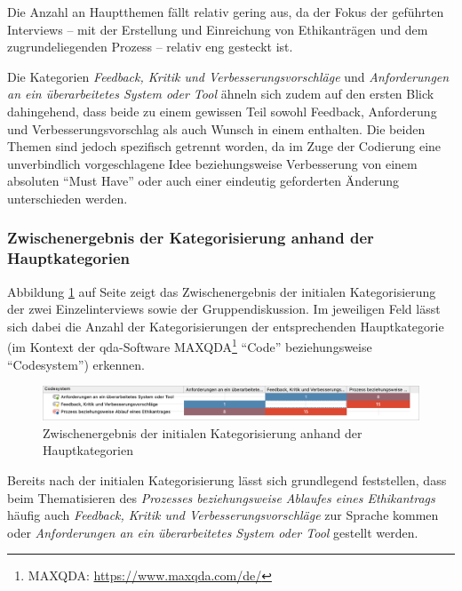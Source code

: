 \documentclass[a4paper,12pt,twoside,numbers=noendperiod]{scrreprt}
\begin{document}
Die Anzahl an Hauptthemen fällt relativ gering aus, da der Fokus der geführten Interviews -- mit der Erstellung und Einreichung von Ethikanträgen und dem zugrundeliegenden Prozess -- relativ eng gesteckt ist.

Die Kategorien \textit{Feedback, Kritik und Verbesserungsvorschläge} und \textit{Anforderungen an ein überarbeitetes System oder Tool} ähneln sich zudem auf den ersten Blick dahingehend, dass beide zu einem gewissen Teil sowohl Feedback, Anforderung und Verbesserungsvorschlag als auch Wunsch in einem enthalten. Die beiden Themen sind jedoch spezifisch getrennt worden, da im Zuge der Codierung eine unverbindlich vorgeschlagene Idee beziehungsweise Verbesserung von einem absoluten \enquote{Must Have} oder auch einer eindeutig geforderten Änderung unterschieden werden.

\subsubsection*{Zwischenergebnis der Kategorisierung anhand der Hauptkategorien}
\label{sub-sub-sec:zwischenstand-hauptkategorisisierung}

Abbildung \ref{fig:zwischenstand-hauptkategorisierung} auf Seite \pageref{fig:zwischenstand-hauptkategorisierung} zeigt das Zwischenergebnis der initialen Kategorisierung der zwei Einzelinterviews sowie der Gruppendiskussion. Im jeweiligen Feld lässt sich dabei die Anzahl der Kategorisierungen der entsprechenden Hauptkategorie (im Kontext der \ac{qda}-Software MAXQDA\footnote{MAXQDA: \url{https://www.maxqda.com/de/}} \enquote{Code} beziehungsweise \enquote{Codesystem}) erkennen.

\begin{figure}[ht]
    \centering
    \includegraphics[width=\linewidth]{thesis/images/Luidold_Hauptkategorien-Zwischenergebnis.png}
    \caption{Zwischenergebnis der initialen Kategorisierung anhand der Hauptkategorien}
    \label{fig:zwischenstand-hauptkategorisierung}
\end{figure}

Bereits nach der initialen Kategorisierung lässt sich grundlegend feststellen, dass beim Thematisieren des \textit{Prozesses beziehungsweise Ablaufes eines Ethikantrags} häufig auch \textit{Feedback, Kritik und Verbesserungsvorschläge} zur Sprache kommen oder \textit{Anforderungen an ein überarbeitetes System oder Tool} gestellt werden.
\end{document}
